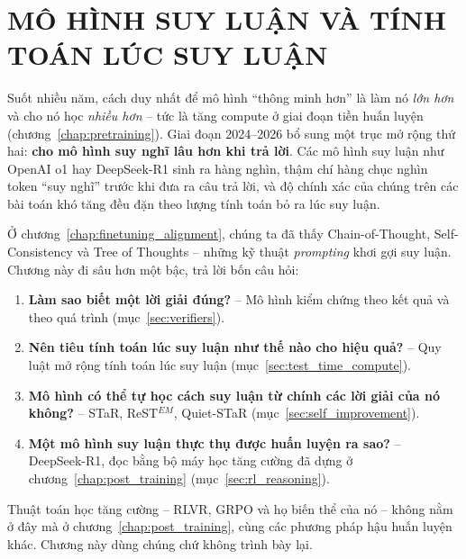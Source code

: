 
\chapter{MÔ HÌNH SUY LUẬN VÀ TÍNH TOÁN LÚC SUY LUẬN}
\label{chap:reasoning}

Suốt nhiều năm, cách duy nhất để mô hình “thông minh hơn” là làm nó \emph{lớn hơn} và cho nó học \emph{nhiều hơn} -- tức là tăng compute ở giai đoạn tiền huấn luyện (chương~\ref{chap:pretraining}). Giai đoạn 2024--2026 bổ sung một trục mở rộng thứ hai: \textbf{cho mô hình suy nghĩ lâu hơn khi trả lời}. Các mô hình suy luận như OpenAI o1 hay DeepSeek-R1 sinh ra hàng nghìn, thậm chí hàng chục nghìn token “suy nghĩ” trước khi đưa ra câu trả lời, và độ chính xác của chúng trên các bài toán khó tăng đều đặn theo lượng tính toán bỏ ra lúc suy luận.

Ở chương~\ref{chap:finetuning_alignment}, chúng ta đã thấy Chain-of-Thought, Self-Consistency và Tree of Thoughts -- những kỹ thuật \emph{prompting} khơi gợi suy luận. Chương này đi sâu hơn một bậc, trả lời bốn câu hỏi:
\begin{enumerate}
	\item \textbf{Làm sao biết một lời giải đúng?} -- Mô hình kiểm chứng theo kết quả và theo quá trình (mục~\ref{sec:verifiers}).
	\item \textbf{Nên tiêu tính toán lúc suy luận như thế nào cho hiệu quả?} -- Quy luật mở rộng tính toán lúc suy luận (mục~\ref{sec:test_time_compute}).
	\item \textbf{Mô hình có thể tự học cách suy luận từ chính các lời giải của nó không?} -- STaR, ReST$^{EM}$, Quiet-STaR (mục~\ref{sec:self_improvement}).
	\item \textbf{Một mô hình suy luận thực thụ được huấn luyện ra sao?} -- DeepSeek-R1, đọc bằng bộ máy học tăng cường đã dựng ở chương~\ref{chap:post_training} (mục~\ref{sec:rl_reasoning}).
\end{enumerate}

Thuật toán học tăng cường -- RLVR, GRPO và họ biến thể của nó -- không nằm ở đây mà ở chương~\ref{chap:post_training}, cùng các phương pháp hậu huấn luyện khác. Chương này dùng chúng chứ không trình bày lại.
